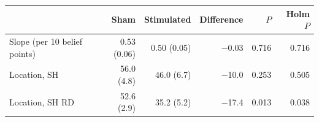 \small
\begin{tabular}{lrrrrr}
\toprule
& Sham & Stimulated & Difference & $P$ & Holm $P$ \\
\midrule
Slope (per 10 belief points) & 0.53 (0.06) & 0.50 (0.05) & $-$0.03 & 0.716 & 0.716 \\
Location, SH & 56.0 (4.8) & 46.0 (6.7) & $-$10.0 & 0.253 & 0.505 \\
Location, SH RD & 52.6 (2.9) & 35.2 (5.2) & $-$17.4 & 0.013 & 0.038 \\
\bottomrule
\end{tabular}
